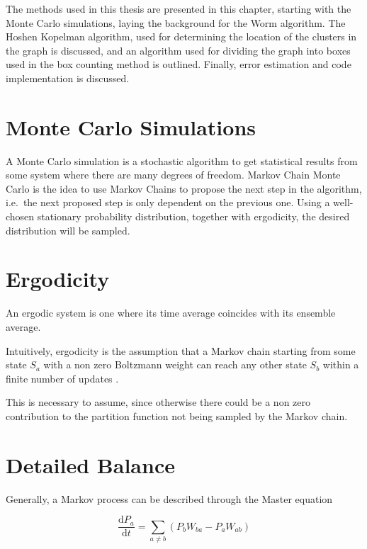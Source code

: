 
The methods used in this thesis are presented in this chapter, starting with the Monte Carlo simulations, laying the background for the Worm algorithm. The Hoshen Kopelman algorithm, used for determining the location of the clusters in the graph is discussed, and an algorithm used for dividing the graph into boxes used in the box counting method is outlined. Finally, error estimation and code implementation is discussed.

\section{Monte Carlo Simulations}
\label{sec:MonteCarloSims}

A Monte Carlo simulation is a stochastic algorithm to get statistical results from some system where there are many degrees of freedom. Markov Chain Monte Carlo is the idea to use Markov Chains to propose the next step in the algorithm, i.e.\ the next proposed step is only dependent on the previous one. Using a well-chosen stationary probability distribution, together with ergodicity, the desired distribution will be sampled.

\section{Ergodicity}
\label{sec:Ergodicity}

An ergodic system is one where its time average coincides with its ensemble average. 

Intuitively, ergodicity is the assumption that a Markov chain starting from some state $S_a$ with a non zero Boltzmann weight can reach any other state $S_b$ within a finite number of updates \cite{Zwanzig:nonequil_stat_mech}.

This is necessary to assume, since otherwise there could be a non zero contribution to the partition function not being sampled by the Markov chain.

\section{Detailed Balance}
\label{sec:DetailedBalance}

Generally, a Markov process can be described through the Master equation

\begin{equation}
    \frac{\mathrm d P_a}{\mathrm d t} = \sum_{a \neq b} \left ( P_b W_{ba} - P_a W_{ab} \right )
\end{equation}

